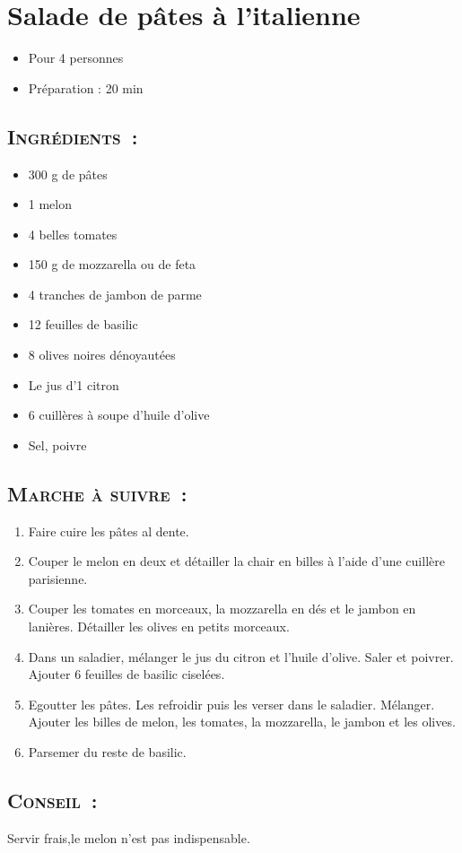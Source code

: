 \section[Salade de pâtes à l'italienne]{Salade de pâtes à l'italienne}		%


\begin{itemize}
\item Pour 4 personnes
\item Préparation : 20 min
\end{itemize}

\subsection{\textsc{Ingr\'edients~:}}

\begin{itemize}
\item 300 g de p\^ates
\item 1 melon
\item 4 belles tomates
\item 150 g de mozzarella ou de feta
\item 4 tranches de jambon de parme
\item 12 feuilles de basilic
\item 8 olives noires d\'enoyaut\'ees
\item Le jus d'1 citron
\item 6 cuill\`eres \`a soupe d'huile d'olive
\item Sel, poivre
\end{itemize}


\subsection{\textsc{Marche \`a suivre~:}}

\begin{enumerate}
\item Faire cuire les p\^ates al dente.

\item Couper le melon en deux et d\'etailler la chair en billes \`a l'aide d'une cuill\`ere parisienne.

\item Couper les tomates en morceaux, la mozzarella en d\'es et le jambon en lani\`eres. D\'etailler les olives en petits morceaux.

\item Dans un saladier, m\'elanger le jus du citron et l'huile d'olive. Saler et poivrer. Ajouter 6 feuilles de basilic cisel\'ees.

\item Egoutter les p\^ates. Les refroidir puis les verser dans le saladier. M\'elanger. Ajouter les billes de melon, les tomates, la mozzarella, le jambon et les olives.

\item Parsemer du reste de basilic.
\end{enumerate}
\subsection{\textsc{Conseil~:}}

Servir frais,le melon n'est pas indispensable.
